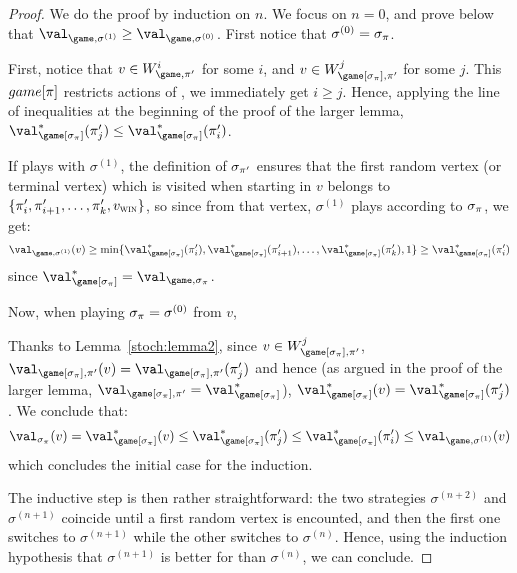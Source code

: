   \begin{proof}
    We do the proof by induction on $n$.  We focus on $n=0$, and prove
    below that $\val_{\game,\sigma^{(1)}} \ge
    \val_{\game,\sigma^{(0)}}$. First notice that $\sigma^{(0)} =
    \sigma_\pi$.

    First, notice that $v \in W_{\game,\perm'}^i$ for some $i$, and $v
    \in W_{\game[\sigma_\perm],\perm'}^j$ for some $j$. This
    $game[\pi]$ restricts actions of \Eve, we immediately get $i \ge
    j$. Hence, applying the line of inequalities at the beginning of
    the proof of the larger lemma,
    $\val^*_{\game[\sigma_\perm]}(\perm'_j) \le
    \val^*_{\game[\sigma_\perm]}(\perm'_i)$.

    If \Eve plays with $\sigma^{(1)}$, the definition of
    $\sigma_{\pi'}$ ensures that the first random vertex (or
    terminal vertex) which is visited when starting in $v$ belongs to
    $\{\pi'_i,\pi'_{i+1},\dots,\pi'_k,v_{\textsc{win}}\}$, so since from
    that vertex, $\sigma^{(1)}$ plays according to $\sigma_\pi$, we
    get:
    \[
    \val_{\game,\sigma^{(1)}}(v) \ge \min
    \{\val^*_{\game[\sigma_\perm]}(\perm'_i),
    \val^*_{\game[\sigma_\perm]}(\perm'_{i+1}),\dots,
    \val^*_{\game[\sigma_\perm]}(\perm'_k),1\} \ge
    \val^*_{\game[\sigma_\perm]}(\perm'_i)
    \]
    since $\val^*_{\game[\sigma_\perm]} = \val_{\game,\sigma_\perm}$.

    Now, when playing $\sigma_\pi = \sigma^{(0)}$ from $v$, 

    Thanks to Lemma~\ref{stoch:lemma2}, since $v \in
    W_{\game[\sigma_\perm],\perm'}^j$,
    $\val_{\game[\sigma_\perm],\perm'}(v) =
    \val_{\game[\sigma_\perm],\perm'}(\perm'_j)$ and hence (as argued
    in the proof of the larger lemma,
    $\val_{\game[\sigma_\perm],\perm'} =
    \val^*_{\game[\sigma_\perm]}$), $\val^*_{\game[\sigma_\perm]}(v) =
    \val^*_{\game[\sigma_\perm]}(\perm'_j)$. We conclude that:
    \[
    \val_{\sigma_\perm}(v) = \val^*_{\game[\sigma_\perm]}(v) \le
    \val^*_{\game[\sigma_\perm]}(\perm'_j) \le
    \val^*_{\game[\sigma_\perm]}(\perm'_i) \le
    \val_{\game,\sigma^{(1)}}(v)
    \]
    which concludes the initial case for the induction.

    \smallskip The inductive step is then rather straightforward: the
    two strategies $\sigma^{(n+2)}$ and $\sigma^{(n+1)}$ coincide
    until a first random vertex is encounted, and then the first one
    switches to $\sigma^{(n+1)}$ while the other switches to
    $\sigma^{(n)}$. Hence, using the induction hypothesis that
    $\sigma^{(n+1)}$ is better for \Eve than $\sigma^{(n)}$, we can
    conclude.
  \end{proof}

